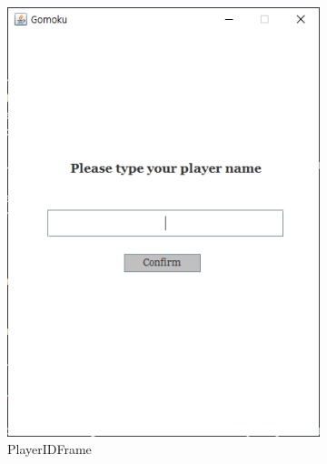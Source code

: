 \documentclass[a4paper, 10pt]{article}
\begin{document}
\begin{figure}[h]
  \centering
  \begin{subfigure}{.24\textwidth}
    \centering
    \includegraphics[width=.9\linewidth]{resource/login}
    \caption{PlayerIDFrame}
    \label{fig:player_id_frame}
  \end{subfigure}
  \begin{subfigure}{.24\textwidth}
    \centering

\end{subfigure}
\end{figure}
\end{document}
